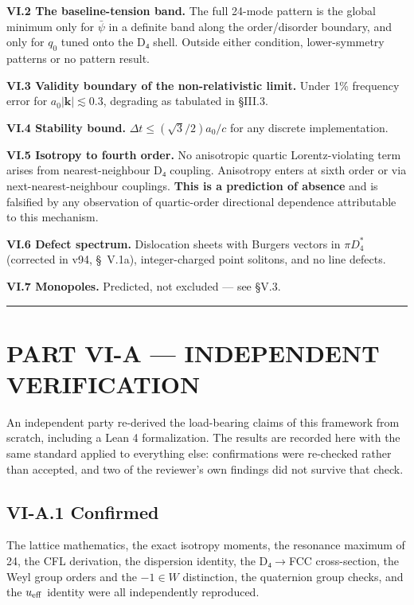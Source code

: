 \documentclass[a4paper,11pt]{article}
\begin{document}
\textbf{VI.2 The baseline-tension band.} The full 24-mode pattern is the global minimum only for $\bar\psi$ in a definite band along the order/disorder boundary, and only for $q_0$ tuned onto the D₄ shell. Outside either condition, lower-symmetry patterns or no pattern result.

\textbf{VI.3 Validity boundary of the non-relativistic limit.} Under 1\% frequency error for $a_0|\mathbf k|\lesssim0.3$, degrading as tabulated in §III.3.

\textbf{VI.4 Stability bound.} $\Delta t\le(\sqrt3/2)a_0/c$ for any discrete implementation.

\textbf{VI.5 Isotropy to fourth order.} No anisotropic quartic Lorentz-violating term arises from nearest-neighbour D₄ coupling. Anisotropy enters at sixth order or via next-nearest-neighbour couplings. \textbf{This is a prediction of absence} and is falsified by any observation of quartic-order directional dependence attributable to this mechanism.

\textbf{VI.6 Defect spectrum.} Dislocation sheets with Burgers vectors in $\pi D_4^*$ (corrected in v94, \S~V.1a), integer-charged point solitons, and no line defects.

\textbf{VI.7 Monopoles.} Predicted, not excluded — see §V.3.

\medskip\hrule\medskip

\section*{PART VI-A — INDEPENDENT VERIFICATION}

An independent party re-derived the load-bearing claims of this framework from scratch, including a Lean 4 formalization. The results are recorded here with the same standard applied to everything else: confirmations were re-checked rather than accepted, and two of the reviewer's own findings did not survive that check.

\subsection*{VI-A.1 Confirmed}

The lattice mathematics, the exact isotropy moments, the resonance maximum of 24, the CFL derivation, the dispersion identity, the D₄$\to$FCC cross-section, the Weyl group orders and the $-1\in W$ distinction, the quaternion group checks, and the $u_{\rm eff}$ identity were all independently reproduced.
\end{document}
